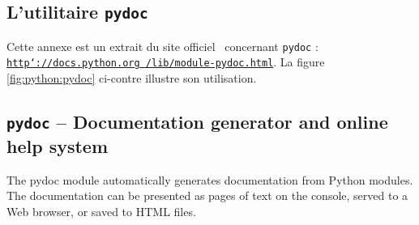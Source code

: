 \subsection{L'utilitaire {\tt pydoc}}\label{python:pydoc}
\noindent Cette annexe est un extrait du site officiel \python\ concernant {\tt pydoc} :
\href{http://docs.python.org/lib/module-pydoc.html}{\tt http\char`://docs.python.org /lib/module-pydoc.html}.
La figure \ref{fig:python:pydoc} ci-contre illustre son utilisation.

\subsection*{{\tt pydoc} -- Documentation generator and online help system}
The pydoc module automatically generates documentation from Python modules. 
The documentation can be presented as pages of text on the console, 
served to a Web browser, or saved to HTML files.

